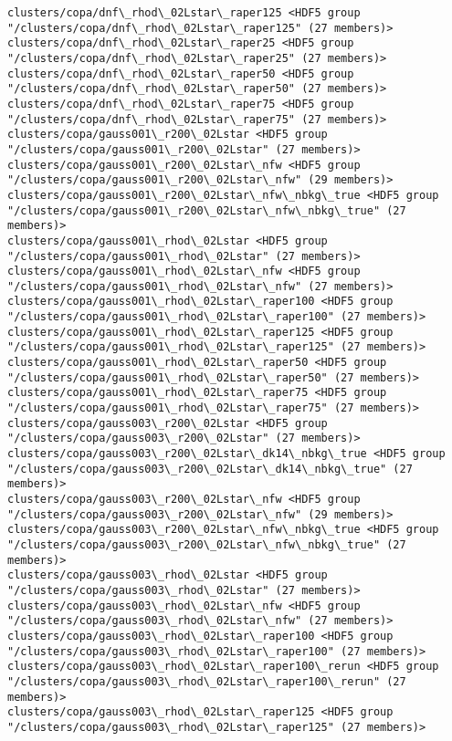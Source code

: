 \documentclass[11pt]{article}
\begin{document}
\begin{Verbatim}[commandchars=\\\{\}]
clusters/copa/dnf\_rhod\_02Lstar\_raper125 <HDF5 group "/clusters/copa/dnf\_rhod\_02Lstar\_raper125" (27 members)>
clusters/copa/dnf\_rhod\_02Lstar\_raper25 <HDF5 group "/clusters/copa/dnf\_rhod\_02Lstar\_raper25" (27 members)>
clusters/copa/dnf\_rhod\_02Lstar\_raper50 <HDF5 group "/clusters/copa/dnf\_rhod\_02Lstar\_raper50" (27 members)>
clusters/copa/dnf\_rhod\_02Lstar\_raper75 <HDF5 group "/clusters/copa/dnf\_rhod\_02Lstar\_raper75" (27 members)>
clusters/copa/gauss001\_r200\_02Lstar <HDF5 group "/clusters/copa/gauss001\_r200\_02Lstar" (27 members)>
clusters/copa/gauss001\_r200\_02Lstar\_nfw <HDF5 group "/clusters/copa/gauss001\_r200\_02Lstar\_nfw" (29 members)>
clusters/copa/gauss001\_r200\_02Lstar\_nfw\_nbkg\_true <HDF5 group "/clusters/copa/gauss001\_r200\_02Lstar\_nfw\_nbkg\_true" (27 members)>
clusters/copa/gauss001\_rhod\_02Lstar <HDF5 group "/clusters/copa/gauss001\_rhod\_02Lstar" (27 members)>
clusters/copa/gauss001\_rhod\_02Lstar\_nfw <HDF5 group "/clusters/copa/gauss001\_rhod\_02Lstar\_nfw" (27 members)>
clusters/copa/gauss001\_rhod\_02Lstar\_raper100 <HDF5 group "/clusters/copa/gauss001\_rhod\_02Lstar\_raper100" (27 members)>
clusters/copa/gauss001\_rhod\_02Lstar\_raper125 <HDF5 group "/clusters/copa/gauss001\_rhod\_02Lstar\_raper125" (27 members)>
clusters/copa/gauss001\_rhod\_02Lstar\_raper50 <HDF5 group "/clusters/copa/gauss001\_rhod\_02Lstar\_raper50" (27 members)>
clusters/copa/gauss001\_rhod\_02Lstar\_raper75 <HDF5 group "/clusters/copa/gauss001\_rhod\_02Lstar\_raper75" (27 members)>
clusters/copa/gauss003\_r200\_02Lstar <HDF5 group "/clusters/copa/gauss003\_r200\_02Lstar" (27 members)>
clusters/copa/gauss003\_r200\_02Lstar\_dk14\_nbkg\_true <HDF5 group "/clusters/copa/gauss003\_r200\_02Lstar\_dk14\_nbkg\_true" (27 members)>
clusters/copa/gauss003\_r200\_02Lstar\_nfw <HDF5 group "/clusters/copa/gauss003\_r200\_02Lstar\_nfw" (29 members)>
clusters/copa/gauss003\_r200\_02Lstar\_nfw\_nbkg\_true <HDF5 group "/clusters/copa/gauss003\_r200\_02Lstar\_nfw\_nbkg\_true" (27 members)>
clusters/copa/gauss003\_rhod\_02Lstar <HDF5 group "/clusters/copa/gauss003\_rhod\_02Lstar" (27 members)>
clusters/copa/gauss003\_rhod\_02Lstar\_nfw <HDF5 group "/clusters/copa/gauss003\_rhod\_02Lstar\_nfw" (27 members)>
clusters/copa/gauss003\_rhod\_02Lstar\_raper100 <HDF5 group "/clusters/copa/gauss003\_rhod\_02Lstar\_raper100" (27 members)>
clusters/copa/gauss003\_rhod\_02Lstar\_raper100\_rerun <HDF5 group "/clusters/copa/gauss003\_rhod\_02Lstar\_raper100\_rerun" (27 members)>
clusters/copa/gauss003\_rhod\_02Lstar\_raper125 <HDF5 group "/clusters/copa/gauss003\_rhod\_02Lstar\_raper125" (27 members)>

\end{Verbatim}
\end{document}

